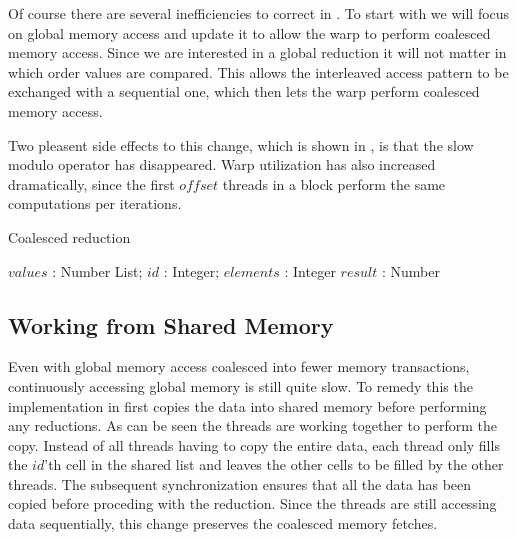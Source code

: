 Of course there are several inefficiencies to correct in
. To start with we will focus on global memory access
and update it to allow the warp to perform coalesced memory access. Since we are
interested in a global reduction it will not matter in which order values are
compared. This allows the interleaved access pattern to be exchanged with a
sequential one, which then lets the warp perform coalesced memory access.


Two pleasent side effects to this change, which is shown in
, is that the slow modulo operator has disappeared.
Warp utilization has also increased dramatically, since the first $offset$
threads in a block perform the same computations per iterations.
\begin{algorithm}
  \caption{Coalesced reduction}
  \label{alg:coalescedReduct}
  \begin{algorithmic}
              {$values$ : Number List; $id$ : Integer; $elements$ : Integer}
              {$result$ : Number}
              {
                  \ENDIF
                  \SYNC
                \ENDWHILE
                \ENDIF
              }
  \end{algorithmic}
\end{algorithm}



\subsection{Working from Shared Memory}\label{sec:usingSharedMem}

Even with global memory access coalesced into fewer memory transactions,
continuously accessing global memory is still quite slow. To remedy this the
implementation in  first copies the data into shared
memory before performing any reductions. As can be seen the threads are working
together to perform the copy. Instead of all threads having to copy the entire
data, each thread only fills the $id$'th cell in the shared list and leaves the
other cells to be filled by the other threads. The subsequent synchronization
ensures that all the data has been copied before proceding with the
reduction. Since the threads are still accessing data sequentially, this change
preserves the coalesced memory fetches.

